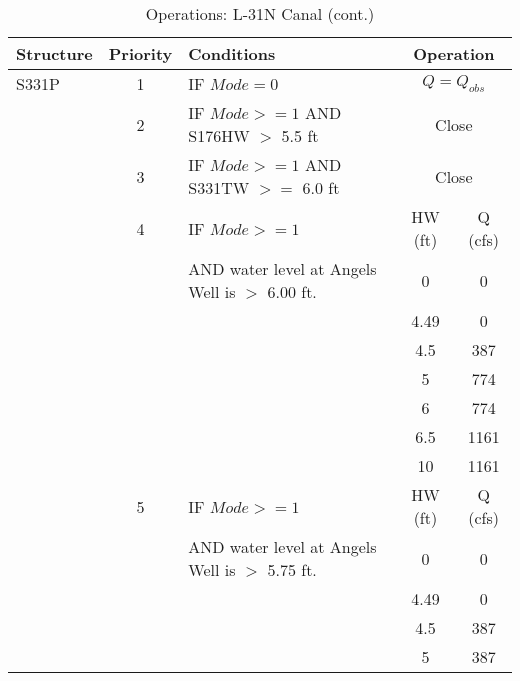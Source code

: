 \scriptsize
\begin{table}[!h]
\centering
\caption{Operations: L-31N Canal (cont.)}
\label{tab:M11opsL31Nc}
\begin{tabular}{|l|c|l|c|c|}
\hline
\textbf{Structure} & \textbf{Priority}  & \textbf{Conditions} & \multicolumn{2}{|c|}{\textbf{Operation}}   \\
\hline
\hline

S331P         &  1  & IF $Mode=0$                                  & \multicolumn{2}{|c|}{$Q = Q_{obs}$}   \\
\hline
              &  2  & IF $Mode>=1$ AND S176HW $>$ 5.5 ft           & \multicolumn{2}{|c|}{Close}  \\
\hline
              &  3  & IF $Mode>=1$ AND S331TW $>=$ 6.0 ft          & \multicolumn{2}{|c|}{Close}  \\
\hline
              &  4  & IF $Mode>=1$                                 &  HW (ft) & Q (cfs)  \\
              &     & AND water level at Angels Well is $>$ 6.00 ft.      & 0	&	  0    \\
              &     &                                              & 4.49	&	  0    \\
              &     &                                              & 4.5	&	387  \\
              &     &                                              & 5	&	774  \\
              &     &                                              & 6	&	774  \\
              &     &                                              & 6.5	&	1161  \\
              &     &                                              & 10	&	1161  \\
\hline
              &  5  & IF $Mode>=1$                                 &  HW (ft) & Q (cfs)  \\
              &     & AND water level at Angels Well is $>$ 5.75 ft.  & 0	&	  0    \\
              &     &                                              & 4.49	&	  0    \\
              &     &                                              & 4.5	&	387  \\
              &     &                                              & 5	&	387  \\

\end{tabular}
\end{table}
